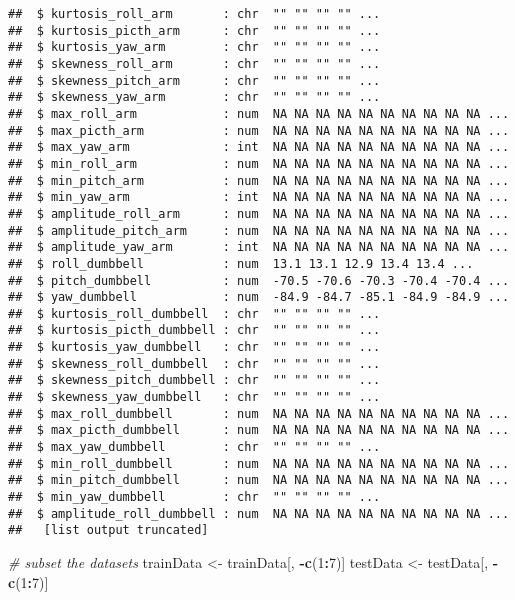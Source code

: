 \documentclass[
]{article}
\newenvironment{Shaded}{\begin{snugshade}}{\end{snugshade}}
\newcommand{\CommentTok}[1]{\textcolor[rgb]{0.56,0.35,0.01}{\textit{#1}}}
\newcommand{\DecValTok}[1]{\textcolor[rgb]{0.00,0.00,0.81}{#1}}
\newcommand{\FunctionTok}[1]{\textcolor[rgb]{0.13,0.29,0.53}{\textbf{#1}}}
\newcommand{\NormalTok}[1]{#1}
\newcommand{\OtherTok}[1]{\textcolor[rgb]{0.56,0.35,0.01}{#1}}
\newcommand{\SpecialCharTok}[1]{\textcolor[rgb]{0.81,0.36,0.00}{\textbf{#1}}}
\begin{document}
\begin{verbatim}
##  $ kurtosis_roll_arm       : chr  "" "" "" "" ...
##  $ kurtosis_picth_arm      : chr  "" "" "" "" ...
##  $ kurtosis_yaw_arm        : chr  "" "" "" "" ...
##  $ skewness_roll_arm       : chr  "" "" "" "" ...
##  $ skewness_pitch_arm      : chr  "" "" "" "" ...
##  $ skewness_yaw_arm        : chr  "" "" "" "" ...
##  $ max_roll_arm            : num  NA NA NA NA NA NA NA NA NA NA ...
##  $ max_picth_arm           : num  NA NA NA NA NA NA NA NA NA NA ...
##  $ max_yaw_arm             : int  NA NA NA NA NA NA NA NA NA NA ...
##  $ min_roll_arm            : num  NA NA NA NA NA NA NA NA NA NA ...
##  $ min_pitch_arm           : num  NA NA NA NA NA NA NA NA NA NA ...
##  $ min_yaw_arm             : int  NA NA NA NA NA NA NA NA NA NA ...
##  $ amplitude_roll_arm      : num  NA NA NA NA NA NA NA NA NA NA ...
##  $ amplitude_pitch_arm     : num  NA NA NA NA NA NA NA NA NA NA ...
##  $ amplitude_yaw_arm       : int  NA NA NA NA NA NA NA NA NA NA ...
##  $ roll_dumbbell           : num  13.1 13.1 12.9 13.4 13.4 ...
##  $ pitch_dumbbell          : num  -70.5 -70.6 -70.3 -70.4 -70.4 ...
##  $ yaw_dumbbell            : num  -84.9 -84.7 -85.1 -84.9 -84.9 ...
##  $ kurtosis_roll_dumbbell  : chr  "" "" "" "" ...
##  $ kurtosis_picth_dumbbell : chr  "" "" "" "" ...
##  $ kurtosis_yaw_dumbbell   : chr  "" "" "" "" ...
##  $ skewness_roll_dumbbell  : chr  "" "" "" "" ...
##  $ skewness_pitch_dumbbell : chr  "" "" "" "" ...
##  $ skewness_yaw_dumbbell   : chr  "" "" "" "" ...
##  $ max_roll_dumbbell       : num  NA NA NA NA NA NA NA NA NA NA ...
##  $ max_picth_dumbbell      : num  NA NA NA NA NA NA NA NA NA NA ...
##  $ max_yaw_dumbbell        : chr  "" "" "" "" ...
##  $ min_roll_dumbbell       : num  NA NA NA NA NA NA NA NA NA NA ...
##  $ min_pitch_dumbbell      : num  NA NA NA NA NA NA NA NA NA NA ...
##  $ min_yaw_dumbbell        : chr  "" "" "" "" ...
##  $ amplitude_roll_dumbbell : num  NA NA NA NA NA NA NA NA NA NA ...
##   [list output truncated]
\end{verbatim}

\begin{Shaded}
\begin{Highlighting}[]
\CommentTok{\# subset the datasets}
\NormalTok{trainData }\OtherTok{\textless{}{-}}\NormalTok{ trainData[, }\SpecialCharTok{{-}}\FunctionTok{c}\NormalTok{(}\DecValTok{1}\SpecialCharTok{:}\DecValTok{7}\NormalTok{)]}
\NormalTok{testData }\OtherTok{\textless{}{-}}\NormalTok{ testData[, }\SpecialCharTok{{-}}\FunctionTok{c}\NormalTok{(}\DecValTok{1}\SpecialCharTok{:}\DecValTok{7}\NormalTok{)]}
\end{Highlighting}
\end{Shaded}
\end{document}
